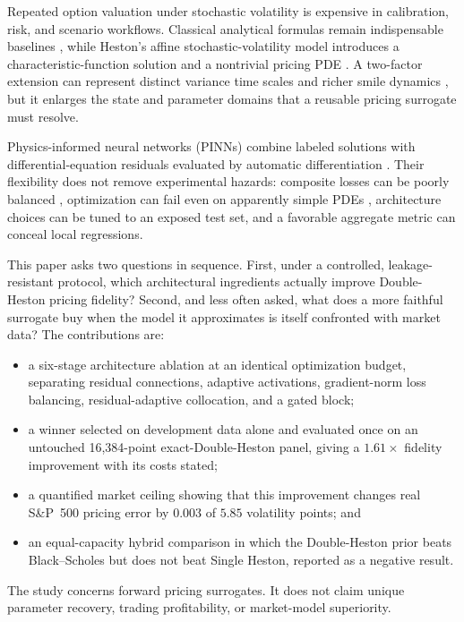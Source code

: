 \documentclass[conference]{IEEEtran}
\begin{document}
Repeated option valuation under stochastic volatility is expensive in
calibration, risk, and scenario workflows. Classical analytical formulas remain
indispensable baselines \cite{black1973,black1976}, while Heston's affine
stochastic-volatility model introduces a characteristic-function solution and a
nontrivial pricing PDE \cite{heston1993}. A two-factor extension can represent
distinct variance time scales and richer smile dynamics \cite{cjh2009}, but it
enlarges the state and parameter domains that a reusable pricing surrogate must
resolve.

Physics-informed neural networks (PINNs) combine labeled solutions with
differential-equation residuals evaluated by automatic differentiation
\cite{raissi2019,karniadakis2021}. Their flexibility does not remove
experimental hazards: composite losses can be poorly balanced
\cite{wang2021,wang2022}, optimization can fail even on apparently simple PDEs
\cite{krishnapriyan2021}, architecture choices can be tuned to an exposed test
set, and a favorable aggregate metric can conceal local regressions.

This paper asks two questions in sequence. First, under a controlled,
leakage-resistant protocol, which architectural ingredients actually improve
Double-Heston pricing fidelity? Second, and less often asked, what does a more
faithful surrogate buy when the model it approximates is itself confronted with
market data? The contributions are:

\begin{itemize}
\item a six-stage architecture ablation at an identical optimization budget,
      separating residual connections, adaptive activations, gradient-norm loss
      balancing, residual-adaptive collocation, and a gated block;
\item a winner selected on development data alone and evaluated once on an
      untouched 16,384-point exact-Double-Heston panel, giving a $1.61\times$
      fidelity improvement with its costs stated;
\item a quantified market ceiling showing that this improvement changes real
      S\&P~500 pricing error by $0.003$ of $5.85$ volatility points; and
\item an equal-capacity hybrid comparison in which the Double-Heston prior
      beats Black--Scholes but does not beat Single Heston, reported as a
      negative result.
\end{itemize}

The study concerns forward pricing surrogates. It does not claim unique
parameter recovery, trading profitability, or market-model superiority.
\end{document}
